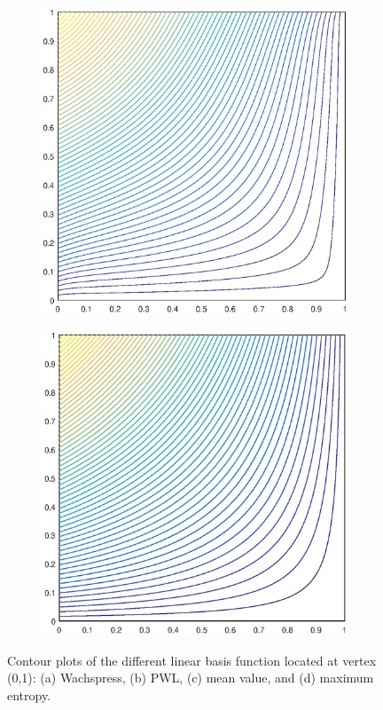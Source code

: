 \begin{figure}
\begin{subfigure}[b]{0.35\textwidth}
		\caption{}
	\end{subfigure}
	\vfill
	\begin{subfigure}[b]{0.35\textwidth}
		\centering
		\includegraphics[width=\textwidth]{figures/sec_BF/square_MV1_contour_b4.eps}
		\caption{}
	\end{subfigure}
	\hspace{1cm}
	\begin{subfigure}[b]{0.35\textwidth}
		\centering
		\includegraphics[width=\textwidth]{figures/sec_BF/square_MAXENT1_contour_b4.eps}
		\caption{}
	\end{subfigure}
\caption{Contour plots of the different linear basis function located at vertex (0,1): (a) Wachspress, (b) PWL, (c) mean value, and (d) maximum entropy.}
\end{figure}

